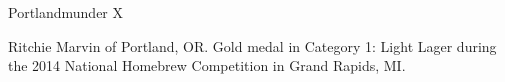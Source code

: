 \begin{recipe}{Portlandmunder X}

\begin{aboutblock}
Ritchie Marvin of Portland, OR. Gold medal in Category 1: Light Lager during the
2014 National Homebrew Competition in Grand Rapids, MI.
\sourceaha
\end{aboutblock}


\begin{methodandtiming}

\begin{mashsteps}
\end{mashsteps}

\begin{fermentationsteps}
\end{fermentationsteps}

\end{methodandtiming}

\recipebreak

\begin{ingredientsblock}

\begin{malts}
\end{malts}

\begin{hops}
\end{hops}


\end{ingredientsblock}

\end{recipe}
